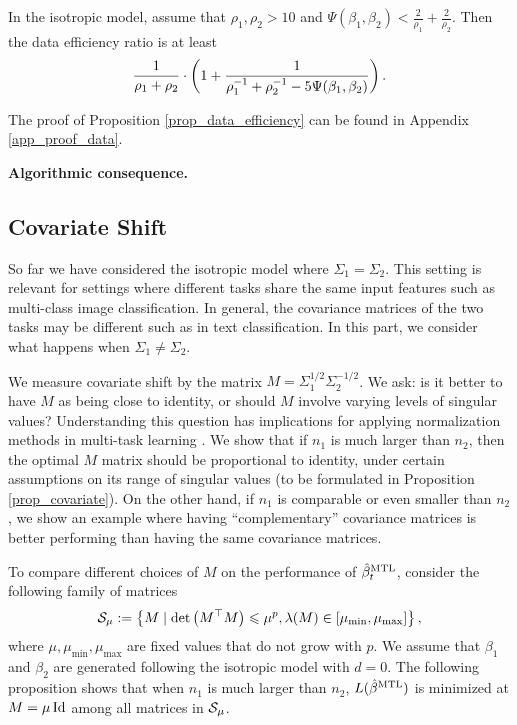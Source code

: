 \begin{proposition}\label{prop_data_efficiency}
	In the isotropic model, assume that $\rho_1,\rho_2 > 10$ and $\Psi(\beta_1, \beta_2) < \frac{2}{\rho_1} + \frac{2}{\rho_2}$.
	Then the data efficiency ratio is at least \[ \frac{1}{\rho_1 + \rho_2}\cdot \left({1 + \frac{1}{\rho_1^{-1} + \rho_2^{-1} - 5\Psi(\beta_1, \beta_2)}}\right). \]
\end{proposition}
The proof of Proposition \ref{prop_data_efficiency} can be found in Appendix \ref{app_proof_data}.

\textbf{Algorithmic consequence.} \todo{}

\subsection{Covariate Shift}

So far we have considered the isotropic model where $\Sigma_1 = \Sigma_2$.
This setting is relevant for settings where different tasks share the same input features such as multi-class image classification.
In general, the covariance matrices of the two tasks may be different such as in text classification.
In this part, we consider what happens when $\Sigma_1 \neq \Sigma_2$.

We measure covariate shift by the matrix $M = \Sigma_1^{1/2} \Sigma_2^{-1/2}$.
We ask: is it better to have $M$ as being close to identity, or should $M$ involve varying levels of singular values?
Understanding this question has implications for applying normalization methods in multi-task learning \cite{LV19,CBLR18,YKGLHF20}.
We show that if $n_1$ is much larger than $n_2$, then the optimal $M$ matrix should be proportional to identity, under certain assumptions on its range of singular values (to be formulated in Proposition \ref{prop_covariate}).
On the other hand, if $n_1$ is comparable or even smaller than $n_2$, we show an example where having ``complementary'' covariance matrices is better performing than having the same covariance matrices.

	To compare different choices of $M$ on the performance of $\hat{\beta}_t^{\text{MTL}}$, consider the following family of matrices
	\begin{align*}
		\mathcal{S}_{\mu}:=\left\{ M \mid \det\left({ M^\top M}\right) \leqslant \mu^p, \lambda(M) \in [\mu_{\min}, \mu_{\max}] \right\},
	\end{align*}
	where $\mu, \mu_{\min}, \mu_{\max}$ are fixed values that do not grow with $p$.
	We assume that $\beta_1$ and $\beta_2$ are generated following the isotropic model with $d = 0$.
	The following proposition shows that when $n_1$ is much larger than $n_2$, $L(\hat{\beta}^{\text{MTL}})$ is minimized at $M = \mu\operatorname{Id}$ among all matrices in $\mathcal{S}_{\mu}$.

